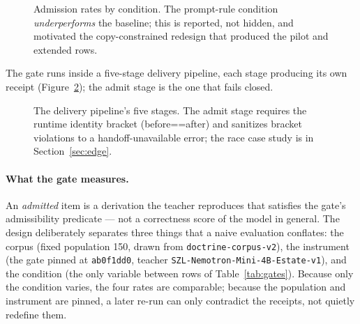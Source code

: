 ﻿\documentclass[11pt]{article}
\begin{document}
\begin{figure}[htbp]
\centering
{}
\caption{Admission rates by condition. The prompt-rule condition \emph{underperforms} the baseline; this is reported, not hidden, and motivated the copy-constrained redesign that produced the pilot and extended rows.}
\label{fig:gates}
\end{figure}

The gate runs inside a five-stage delivery pipeline, each stage producing its own receipt (Figure~\ref{fig:deploypipe}); the admit stage is the one that fails closed.

\begin{figure}[htbp]
\centering
{}
\caption{The delivery pipeline's five stages. The admit stage requires the runtime identity bracket (before==after) and sanitizes bracket violations to a handoff-unavailable error; the race case study is in Section~\ref{sec:edge}.}
\label{fig:deploypipe}
\end{figure}

\paragraph{What the gate measures.} An \emph{admitted} item is a derivation the teacher reproduces that satisfies the gate's admissibility predicate --- not a correctness score of the model in general. The design deliberately separates three things that a naive evaluation conflates: the corpus (fixed population 150, drawn from \texttt{doctrine-corpus-v2}), the instrument (the gate pinned at \texttt{ab0f1dd0}, teacher \texttt{SZL-Nemotron-Mini-4B-Estate-v1}), and the condition (the only variable between rows of Table~\ref{tab:gates}). Because only the condition varies, the four rates are comparable; because the population and instrument are pinned, a later re-run can only contradict the receipts, not quietly redefine them.
\end{document}

